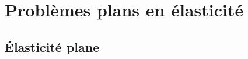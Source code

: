 
\chapter{Problèmes plans en élasticité}\label{chap:Ch08}
\section{Élasticité plane}\label{sec:Ch08-1}
